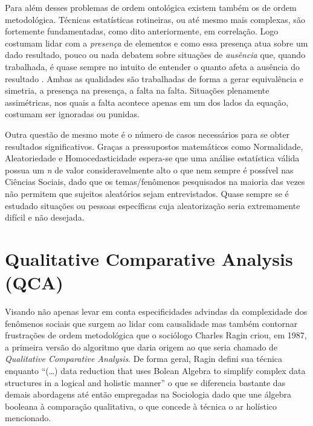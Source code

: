 \documentclass[
	12pt,				%
	oneside,			%
	a4paper,			%
	sumario=tradicional,
	english,			%
	brazil				%
	]{abntex2}
\begin{document}
Para além desses problemas de ordem ontológica existem também os de ordem metodológica. Técnicas estatísticas rotineiras, ou até mesmo mais complexas, são fortemente fundamentadas, como dito anteriormente, em correlação. Logo costumam lidar com a \emph{presença} de elementos e como essa presença atua sobre um dado resultado, pouco ou nada debatem sobre situações de \emph{ausência} \autocite[100]{dusa_mathematical_2008} que, quando trabalhada, é quase sempre no intuito de entender o quanto afeta a ausência do resultado \autocite[22]{ragin_redesigning_2008}. Ambas as qualidades são trabalhadas de forma a gerar equivalência e simetria, a presença na presença, a falta na falta. Situações plenamente assimétricas, nos quais a falta acontece apenas em um dos lados da equação, costumam ser ignoradas ou punidas.

Outra questão de mesmo mote é o número de casos necessários para se obter resultados significativos. Graças a pressupostos matemáticos como Normalidade, Aleatoriedade e Homocedasticidade espera-se que uma análise estatística válida possua um \emph{n} de valor consideravelmente alto o que nem sempre é possível nas Ciências Sociais, dado que os temas/fenômenos pesquisados na maioria das vezes não permitem que sujeitos aleatórios sejam entrevistados. Quase sempre se é estudado situações ou pessoas específicas cuja aleatorização seria extremamente difícil e não desejada.

\hypertarget{qualitative-comparative-analysis-qca}{%
\section{Qualitative Comparative Analysis (QCA)}\label{qualitative-comparative-analysis-qca}}

Visando não apenas levar em conta especificidades advindas da complexidade dos fenômenos sociais que surgem ao lidar com causalidade mas também contornar frustrações de ordem metodológica que o sociólogo Charles Ragin criou, em 1987, a primeira versão do algoritmo que daria origem ao que seria chamado de \emph{Qualitative Comparative Analysis}. De forma geral, Ragin defini sua técnica enquanto ``(\ldots) data reduction that uses Bolean Algebra to simplify complex data structures in a logical and holistic manner'' \autocite[viii]{ragin_comparative_1987} o que se diferencia bastante das demais abordagens até então empregadas na Sociologia dado que une álgebra booleana à comparação qualitativa, o que concede à técnica o ar holístico mencionado.
\end{document}
